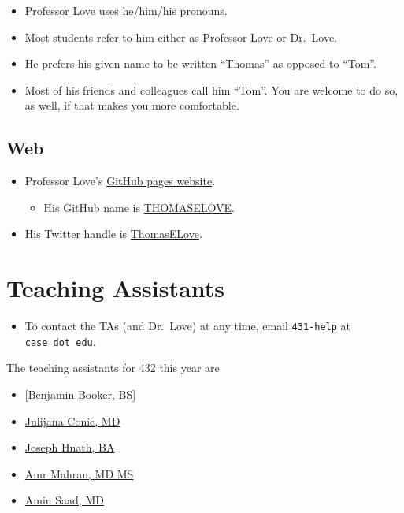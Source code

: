 \documentclass[
]{book}
\providecommand{\tightlist}{%
  \setlength{\itemsep}{0pt}\setlength{\parskip}{0pt}}
\begin{document}
\begin{itemize}
\tightlist
\item
  Professor Love uses he/him/his pronouns.
\item
  Most students refer to him either as Professor Love or Dr.~Love.
\item
  He prefers his given name to be written ``Thomas'' as opposed to ``Tom''.
\item
  Most of his friends and colleagues call him ``Tom''. You are welcome to do so, as well, if that makes you more comfortable.
\end{itemize}

\hypertarget{web}{%
\section{Web}\label{web}}

\begin{itemize}
\tightlist
\item
  Professor Love's \href{https://thomaselove.github.io/}{GitHub pages website}.

  \begin{itemize}
  \tightlist
  \item
    His GitHub name is \href{https://github.com/thomaselove}{THOMASELOVE}.
  \end{itemize}
\item
  His Twitter handle is \href{https://twitter.com/ThomasELove}{ThomasELove}.
\end{itemize}

\hypertarget{teaching-assistants}{%
\chapter{Teaching Assistants}\label{teaching-assistants}}

\begin{itemize}
\tightlist
\item
  To contact the TAs (and Dr.~Love) at any time, email \texttt{431-help} at \texttt{case\ dot\ edu}.
\end{itemize}

The teaching assistants for 432 this year are

\begin{itemize}
\tightlist
\item
  {[}Benjamin Booker, BS{]}
\item
  \protect\hyperlink{julijana-conic-md}{Julijana Conic, MD}
\item
  \protect\hyperlink{joseph-hnath-ba}{Joseph Hnath, BA}
\item
  \protect\hyperlink{amr-mahran-md-ms}{Amr Mahran, MD MS}
\item
  \protect\hyperlink{amin-saad-md}{Amin Saad, MD}
\end{itemize}
\end{document}
